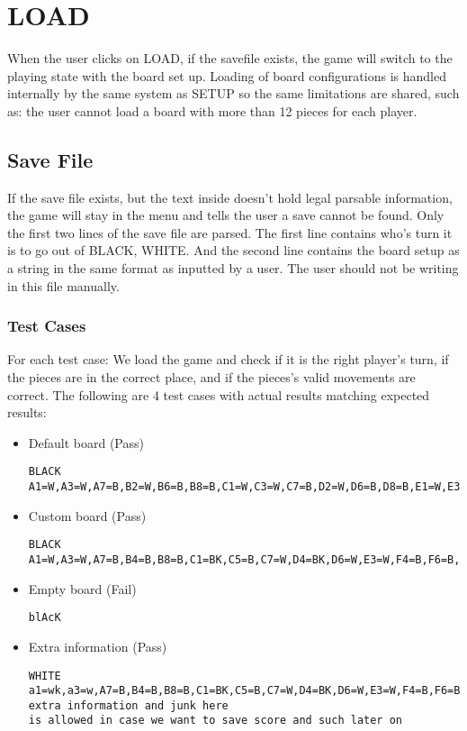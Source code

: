 \documentclass{article}
\begin{document}
\section{LOAD} \label{a2:s:load}
When the user clicks on LOAD, if the savefile exists, the game will switch to the playing state with the board set up.
Loading of board configurations is handled internally by the same system as SETUP so the same limitations are shared,
such as: the user cannot load a board with more than 12 pieces for each player.

\subsection{Save File}
If the save file exists, but the text inside doesn't hold legal parsable information, the game will stay in the menu and tells the user a save cannot be found.
Only the first two lines of the save file are parsed. The first line contains who's turn it is to go out of {BLACK, WHITE}.
And the second line contains the board setup as a string in the same format as inputted by a user.
The user should not be writing in this file manually.

\subsubsection*{Test Cases}
For each test case:
We load the game and check if it is the right player's turn, if the pieces are in the correct place, and if the pieces's valid movements are correct.
The following are 4 test cases with actual results matching expected results:

\begin{itemize}
\item Default board (Pass)\hfill
\begin{lstlisting}
BLACK
A1=W,A3=W,A7=B,B2=W,B6=B,B8=B,C1=W,C3=W,C7=B,D2=W,D6=B,D8=B,E1=W,E3=W,E7=B,F2=W,F6=B,F8=B,G1=W,G3=W,G7=B,H2=W,H6=B,H8=B
\end{lstlisting}

\item Custom board (Pass)\hfill 
\begin{lstlisting}
BLACK
A1=W,A3=W,A7=B,B4=B,B8=B,C1=BK,C5=B,C7=W,D4=BK,D6=W,E3=W,F4=B,F6=B,F8=WK,G1=W,G3=W,G5=W,G7=WK,H6=B
\end{lstlisting}

\item Empty board (Fail)\hfill 
\begin{lstlisting}
blAcK

\end{lstlisting}

\item Extra information (Pass)\hfill 
\begin{lstlisting}
WHITE
a1=wk,a3=w,A7=B,B4=B,B8=B,C1=BK,C5=B,C7=W,D4=BK,D6=W,E3=W,F4=B,F6=B,F8=WK,G1=W,G3=W,G5=W,G7=WK,H6=B
extra information and junk here
is allowed in case we want to save score and such later on

\end{lstlisting}
\end{itemize}
\end{document}
